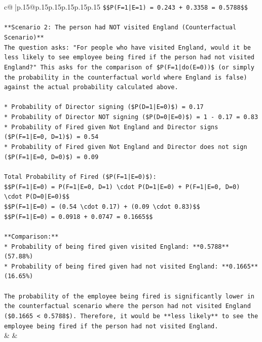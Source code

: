 \documentclass{article}
\begin{document}
{\begin{supertabular}{c@{$\;$}|p{.15\linewidth}@{}p{.15\linewidth}p{.15\linewidth}p{.15\linewidth}p{.15\linewidth}p{.15\linewidth}}
{{{\texttt{\$\$P(F=1|E=1) = 0.243 + 0.3358 = 0.5788\$\$} \\
\\ 
\texttt{**Scenario 2: The person had NOT visited England (Counterfactual Scenario)**} \\
\texttt{The question asks: "For people who have visited England, would it be less likely to see employee being fired if the person had not visited England?" This asks for the comparison of \$P(F=1|do(E=0))\$ (or simply the probability in the counterfactual world where England is false) against the actual probability calculated above.} \\
\\ 
\texttt{*   Probability of Director signing (\$P(D=1|E=0)\$) = 0.17} \\
\texttt{*   Probability of Director NOT signing (\$P(D=0|E=0)\$) = 1 {-} 0.17 = 0.83} \\
\texttt{*   Probability of Fired given Not England and Director signs (\$P(F=1|E=0, D=1)\$) = 0.54} \\
\texttt{*   Probability of Fired given Not England and Director does not sign (\$P(F=1|E=0, D=0)\$) = 0.09} \\
\\ 
\texttt{Total Probability of Fired (\$P(F=1|E=0)\$):} \\
\texttt{\$\$P(F=1|E=0) = P(F=1|E=0, D=1) \textbackslash{}cdot P(D=1|E=0) + P(F=1|E=0, D=0) \textbackslash{}cdot P(D=0|E=0)\$\$} \\
\texttt{\$\$P(F=1|E=0) = (0.54 \textbackslash{}cdot 0.17) + (0.09 \textbackslash{}cdot 0.83)\$\$} \\
\texttt{\$\$P(F=1|E=0) = 0.0918 + 0.0747 = 0.1665\$\$} \\
\\ 
\texttt{**Comparison:**} \\
\texttt{*   Probability of being fired given visited England: **0.5788** (57.88\%)} \\
\texttt{*   Probability of being fired given had not visited England: **0.1665** (16.65\%)} \\
\\ 
\texttt{The probability of the employee being fired is significantly lower in the counterfactual scenario where the person had not visited England (\$0.1665 < 0.5788\$). Therefore, it would be **less likely** to see the employee being fired if the person had not visited England.} \\
            }
        }
    }
    & & \\ \\


\end{supertabular}}
\end{document}
